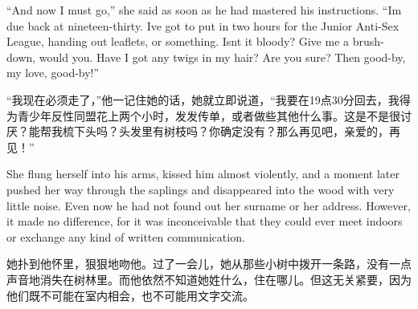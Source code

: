 \begin{paracol}{2}
``And now I must go,'' she said as soon as he had mastered his
instructions. ``I\textquotesingle m due back at nineteen-thirty.
I\textquotesingle ve got to put in two hours for the Junior Anti-Sex
League, handing out leaflets, or something. Isn\textquotesingle t it
bloody? Give me a brush-down, would you. Have I got any twigs in my
hair? Are you sure? Then good-by, my love, good-by!''

\switchcolumn

``我现在必须走了，''他一记住她的话，她就立即说道，``我要在19点30分回去，我得为青少年反性同盟花上两个小时，发发传单，或者做些其他什么事。这是不是很讨厌？能帮我梳下头吗？头发里有树枝吗？你确定没有？那么再见吧，亲爱的，再见！''

\switchcolumn*

She flung herself into his arms, kissed him almost violently, and a
moment later pushed her way through the saplings and disappeared into
the wood with very little noise. Even now he had not found out her
surname or her address. However, it made no difference, for it was
inconceivable that they could ever meet indoors or exchange any kind of
written communication.

\switchcolumn

她扑到他怀里，狠狠地吻他。过了一会儿，她从那些小树中拨开一条路，没有一点声音地消失在树林里。而他依然不知道她姓什么，住在哪儿。但这无关紧要，因为他们既不可能在室内相会，也不可能用文字交流。

\switchcolumn*


\end{paracol}
